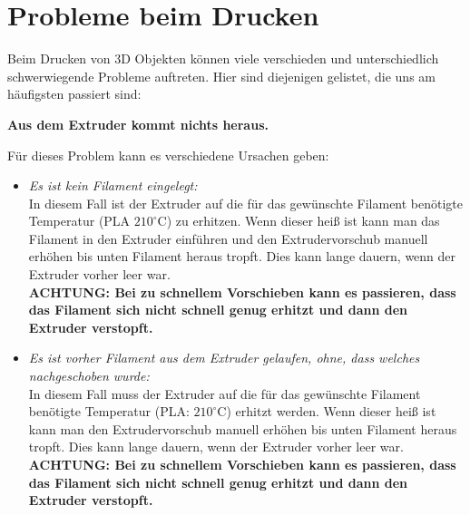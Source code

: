 \documentclass[11pt,a4paper]{scrartcl}
\begin{document}
\section{Probleme beim Drucken}

Beim Drucken von 3D Objekten können viele verschieden und unterschiedlich schwerwiegende Probleme auftreten. Hier sind diejenigen gelistet, die uns am häufigsten passiert sind:\\
\begin{description}

\item \textbf{Aus dem Extruder kommt nichts heraus.}\\
Für dieses Problem kann es verschiedene Ursachen geben:
\begin{itemize}
\item \textit{Es ist kein Filament eingelegt:}\\
In diesem Fall ist der Extruder auf die für das gewünschte Filament benötigte Temperatur (PLA $210^\circ$C) zu erhitzen. Wenn dieser heiß ist kann man das Filament in den Extruder einführen und den Extrudervorschub manuell erhöhen bis unten Filament heraus tropft. Dies kann lange dauern, wenn der Extruder vorher leer war.\\
\textbf{ACHTUNG: Bei zu schnellem Vorschieben kann es passieren, dass das Filament sich nicht schnell genug erhitzt und dann den Extruder verstopft.}

\item \textit{Es ist vorher Filament aus dem Extruder gelaufen, ohne, dass welches nachgeschoben wurde:}\\
In diesem Fall muss der Extruder auf die für das gewünschte Filament benötigte Temperatur (PLA: $210^\circ$C) erhitzt werden. Wenn dieser heiß ist kann man den Extrudervorschub manuell erhöhen bis unten Filament heraus tropft. Dies kann lange dauern, wenn der Extruder vorher leer war.\\
\textbf{ACHTUNG: Bei zu schnellem Vorschieben kann es passieren, dass das Filament sich nicht schnell genug erhitzt und dann den Extruder verstopft.}
\end{itemize}


\end{description}
\end{document}
